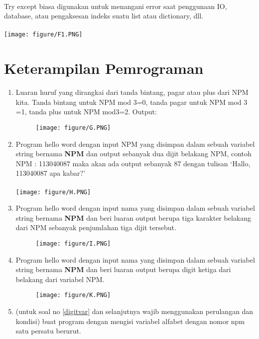 \documentclass{article}
\begin{document}
\paragraph{}
        Try except biasa digunakan untuk menangani error saat penggunaan IO, database, atau pengaksesan indeks suatu list atau dictionary, dll.
       \paragraph{}
        \centerline{\texttt{[image: figure/F1.PNG]}}

\section{Keterampilan Pemrograman}
\begin{enumerate}
\item
Luaran huruf yang dirangkai dari tanda bintang, pagar atau plus dari NPM kita.
Tanda bintang untuk NPM mod 3=0, tanda pagar untuk NPM mod 3 =1, tanda plus untuk NPM mod3=2.
Output:
\begin{figure}[h]
\centerline{\texttt{[image: figure/G.PNG]}}
\end{figure}

\newpage\item
Program hello word dengan input NPM yang disimpan dalam sebuah variabel string bernama \textbf{NPM} dan output sebanyak dua dijit belakang NPM, 
contoh NPM : 113040087 maka akan ada output sebanyak 87 dengan tulisan `Hallo, 113040087 apa kabar?'
\paragraph{}
\centerline{\texttt{[image: figure/H.PNG]}}
\item
Program hello word dengan input nama yang disimpan dalam sebuah variabel string bernama \textbf{NPM} dan beri luaran output berupa tiga karakter belakang dari NPM sebanyak penjumlahan tiga dijit tersebut.
\begin{figure}[h]
\centerline{\texttt{[image: figure/I.PNG]}}
\end{figure}
\item
Program hello word dengan input nama yang disimpan dalam sebuah variabel string bernama \textbf{NPM} dan beri luaran output berupa digit ketiga dari belakang dari variabel NPM.
\begin{figure}[h]
\centerline{\texttt{[image: figure/K.PNG]}}
\end{figure}
\item
\label{digitvar}
(untuk soal no \ref{digitvar} dan selanjutnya wajib menggunakan perulangan dan kondisi) buat program dengan mengisi variabel alfabet dengan nomor npm satu persatu berurut.

\end{enumerate}
\end{document}

